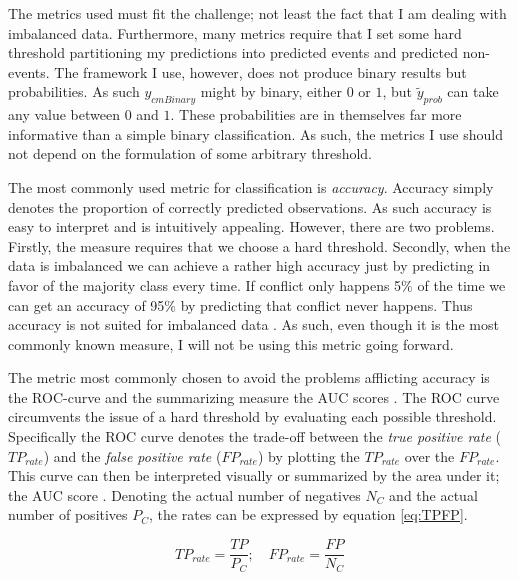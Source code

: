 \documentclass[a4paper]{article}
\begin{document}
The metrics used must fit the challenge; not least the fact that I am dealing with imbalanced data. Furthermore, many metrics require that I set some hard threshold partitioning my predictions into predicted events and predicted non-events. The framework I use, however, does not produce binary results but probabilities. As such $y_{cmBinary}$ might by binary, either $0$ or $1$, but $\tilde{y}_{prob}$ can take any value between $0$ and $1$. These probabilities are in themselves far more informative than a simple binary classification. As such, the metrics I use should not depend on the formulation of some arbitrary threshold.\par 

The most commonly used metric for classification is \emph{accuracy}. Accuracy simply denotes the proportion of correctly predicted observations. As such accuracy is easy to interpret and is intuitively appealing. However, there are two problems. Firstly, the measure requires that we choose a hard threshold. Secondly, when the data is imbalanced we can achieve a rather high accuracy just by predicting in favor of the majority class every time. If conflict only happens 5\% of the time we can get an accuracy of 95\% by predicting that conflict never happens. Thus accuracy is not suited for imbalanced data \citep[1264]{He_2008}. As such, even though it is the most commonly known measure, I will not be using this metric going forward.\par

The metric most commonly chosen to avoid the problems afflicting accuracy is the ROC-curve and the summarizing measure the AUC scores \citep[1277-1278]{He_2008}. The ROC curve circumvents the issue of a hard threshold by evaluating each possible threshold. Specifically the ROC curve denotes the trade-off between the \emph{true positive rate} ($TP_{rate}$) and the \emph{false positive rate} ($FP_{rate}$) by plotting the $TP_{rate}$ over the $FP_{rate}$. This curve can then be interpreted visually or summarized by the area under it; the AUC score \citep[1277-1278]{He_2008}. Denoting the actual number of negatives $N_C$ and the actual number of positives $P_C$, the rates can be expressed by equation \ref{eq:TPFP}.\par

\[
TP_{rate} = \frac{TP}{P_C};\quad FP_{rate}=\frac{FP}{N_C} \tag{15} \label{eq:TPFP}
\]
\end{document}

